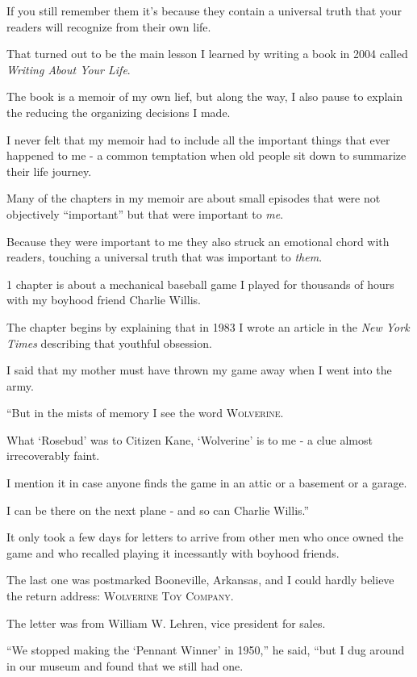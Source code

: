 \documentclass{book}
\numberwithin{equation}{section}
\begin{document}
If you still remember them it's because they contain a universal truth that your readers will recognize from their own life.

%
That turned out to be the main lesson I learned by writing a book in 2004 called \textit{Writing About Your Life}.

The book is a memoir of my own lief, but along the way, I also pause to explain the reducing the organizing decisions I made.

I never felt that my memoir had to include all the important things that ever happened to me - a common temptation when old people sit down to summarize their life journey.

Many of the chapters in my memoir are about small episodes that were not objectively ``important'' but that were important to \textit{me}.

Because they were important to me they also struck an emotional chord with readers, touching a universal truth that was important to \textit{them}.

%
1 chapter is about a mechanical baseball game I played for thousands of hours with my boyhood friend Charlie Willis.

The chapter begins by explaining that in 1983 I wrote an article in the \textit{New York Times} describing that youthful obsession.

I said that my mother must have thrown my game away when I went into the army.

``But in the mists of memory I see the word \textsc{Wolverine}.

What `Rosebud' was to Citizen Kane, `Wolverine' is to me - a clue almost irrecoverably faint.

I mention it in case anyone finds the game in an attic or a basement or a garage.

I can be there on the next plane - and so can Charlie Willis.''

%
It only took a few days for letters to arrive from other men who once owned the game and who recalled playing it incessantly with boyhood friends.

The last one was postmarked Booneville, Arkansas, and I could hardly believe the return address: \textsc{Wolverine Toy Company}.

The letter was from William W. Lehren, vice president for sales.

``We stopped making the `Pennant Winner' in 1950,'' he said, ``but I dug around in our museum and found that we still had one.
\end{document}
